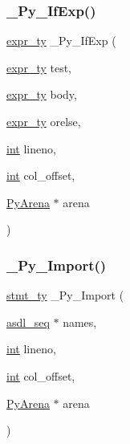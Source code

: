 \mbox{\label{_python-ast_8h_a912e7818e9f2abb4d541e6fb1cba269e}} 
\subsubsection{\texorpdfstring{\_Py\_IfExp()}{\_Py\_IfExp()}}
{\footnotesize\ttfamily \mbox{\hyperlink{_python-ast_8h_a56d3705e020a071405094a220c4592bd}{expr\+\_\+ty}} \+\_\+\+Py\+\_\+\+If\+Exp (\begin{DoxyParamCaption}\item[{\mbox{\hyperlink{_python-ast_8h_a56d3705e020a071405094a220c4592bd}{expr\+\_\+ty}}}]{test,  }\item[{\mbox{\hyperlink{_python-ast_8h_a56d3705e020a071405094a220c4592bd}{expr\+\_\+ty}}}]{body,  }\item[{\mbox{\hyperlink{_python-ast_8h_a56d3705e020a071405094a220c4592bd}{expr\+\_\+ty}}}]{orelse,  }\item[{\mbox{\hyperlink{warnings_8h_a74f207b5aa4ba51c3a2ad59b219a423b}{int}}}]{lineno,  }\item[{\mbox{\hyperlink{warnings_8h_a74f207b5aa4ba51c3a2ad59b219a423b}{int}}}]{col\+\_\+offset,  }\item[{\mbox{\hyperlink{pyarena_8h_a9edeb357fbb27333471022a0975adb7a}{Py\+Arena}} $\ast$}]{arena }\end{DoxyParamCaption})}

\mbox{\label{_python-ast_8h_a023382d2810dee50a2b0f8185043b76d}} 
\subsubsection{\texorpdfstring{\_Py\_Import()}{\_Py\_Import()}}
{\footnotesize\ttfamily \mbox{\hyperlink{_python-ast_8h_a39618071027b661bc03e8916e664e1a7}{stmt\+\_\+ty}} \+\_\+\+Py\+\_\+\+Import (\begin{DoxyParamCaption}\item[{\mbox{\hyperlink{structasdl__seq}{asdl\+\_\+seq}} $\ast$}]{names,  }\item[{\mbox{\hyperlink{warnings_8h_a74f207b5aa4ba51c3a2ad59b219a423b}{int}}}]{lineno,  }\item[{\mbox{\hyperlink{warnings_8h_a74f207b5aa4ba51c3a2ad59b219a423b}{int}}}]{col\+\_\+offset,  }\item[{\mbox{\hyperlink{pyarena_8h_a9edeb357fbb27333471022a0975adb7a}{Py\+Arena}} $\ast$}]{arena }\end{DoxyParamCaption})}

